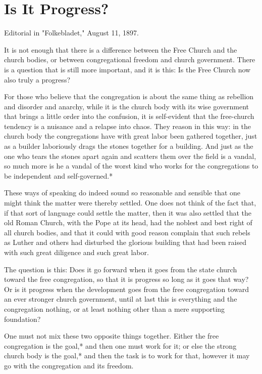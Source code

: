 
\section{Is It Progress?}

Editorial in "Folkebladet," August 11, 1897.

It is not enough that there is a difference between the Free Church and the church bodies, or between congregational freedom and church government. There is a question that is still more important, and it is this: Is the Free Church now also truly a progress?

For those who believe that the congregation is about the same thing as rebellion and disorder and anarchy, while it is the church body with its wise government that brings a little order into the confusion, it is self-evident that the free-church tendency is a nuisance and a relapse into chaos. They reason in this way: in the church body the congregations have with great labor been gathered together, just as a builder laboriously drags the stones together for a building. And just as the one who tears the stones apart again and scatters them over the field is a vandal, so much more is he a vandal of the worst kind who works for the congregations to be independent and self-governed.*

These ways of speaking do indeed sound so reasonable and sensible that one might think the matter were thereby settled. One does not think of the fact that, if that sort of language could settle the matter, then it was also settled that the old Roman Church, with the Pope at its head, had the noblest and best right of all church bodies, and that it could with good reason complain that such rebels as Luther and others had disturbed the glorious building that had been raised with such great diligence and such great labor.

The question is this: Does it go forward when it goes from the state church toward the free congregation, so that it is progress so long as it goes that way? Or is it progress when the development goes from the free congregation toward an ever stronger church government, until at last this is everything and the congregation nothing, or at least nothing other than a mere supporting foundation?

One must not mix these two opposite things together. Either the free congregation is the goal,* and then one must work for it; or else the strong church body is the goal,* and then the task is to work for that, however it may go with the congregation and its freedom.

